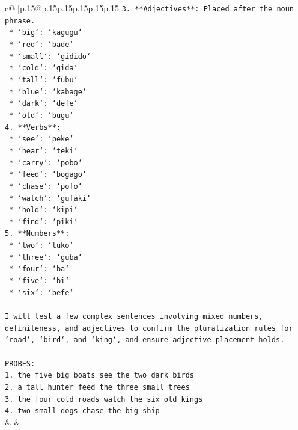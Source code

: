 \documentclass{article}
\begin{document}
{\begin{supertabular}{c@{$\;$}|p{.15\linewidth}@{}p{.15\linewidth}p{.15\linewidth}p{.15\linewidth}p{.15\linewidth}p{.15\linewidth}}
{{{\texttt{3.  **Adjectives**: Placed after the noun phrase.} \\
\texttt{    *   `big`: `kagugu`} \\
\texttt{    *   `red`: `bade`} \\
\texttt{    *   `small`: `gidido`} \\
\texttt{    *   `cold`: `gida`} \\
\texttt{    *   `tall`: `fubu`} \\
\texttt{    *   `blue`: `kabage`} \\
\texttt{    *   `dark`: `defe`} \\
\texttt{    *   `old`: `bugu`} \\
\texttt{4.  **Verbs**:} \\
\texttt{    *   `see`: `peke`} \\
\texttt{    *   `hear`: `teki`} \\
\texttt{    *   `carry`: `pobo`} \\
\texttt{    *   `feed`: `bogago`} \\
\texttt{    *   `chase`: `pofo`} \\
\texttt{    *   `watch`: `gufaki`} \\
\texttt{    *   `hold`: `kipi`} \\
\texttt{    *   `find`: `piki`} \\
\texttt{5.  **Numbers**:} \\
\texttt{    *   `two`: `tuko`} \\
\texttt{    *   `three`: `guba`} \\
\texttt{    *   `four`: `ba`} \\
\texttt{    *   `five`: `bi`} \\
\texttt{    *   `six`: `befe`} \\
\\ 
\texttt{I will test a few complex sentences involving mixed numbers, definiteness, and adjectives to confirm the pluralization rules for `road`, `bird`, and `king`, and ensure adjective placement holds.} \\
\\ 
\texttt{PROBES:} \\
\texttt{1. the five big boats see the two dark birds} \\
\texttt{2. a tall hunter feed the three small trees} \\
\texttt{3. the four cold roads watch the six old kings} \\
\texttt{4. two small dogs chase the big ship} \\
            }
        }
    }
    & & \\ \\


\end{supertabular}}
\end{document}
